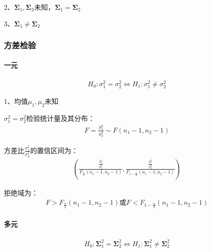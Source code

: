 \documentclass[12pt]{book}
\begin{document}
2、$\bm{\Sigma}_1,\bm{\Sigma}_2$未知，$\bm{\Sigma}_1=\bm{\Sigma}_2$

3、$\bm{\Sigma}_1\neq\bm{\Sigma}_2$

\subsubsection{方差检验}

\paragraph{一元}

\begin{gather*}
    H_0:\sigma_1^2=\sigma_2^2\Leftrightarrow H_1:\sigma_1^2\neq\sigma_2^2
\end{gather*}


1、均值$\mu_1,\mu_2$未知

$\sigma_1^2=\sigma_2^2$检验统计量及其分布：
\begin{gather*}
    F=\frac{S_1^2}{S_2^2}\sim F(n_1-1,n_2-1)
\end{gather*}


方差比$\frac{\sigma_1^2}{\sigma_2^2}$的置信区间为：
\begin{gather*}
    \left(
        \frac{\frac{S^2_1}{S_2^2}}{F_{\frac{\alpha}{2}}(n_1-1,n_2-1)},
        \frac{\frac{S^2_1}{S_2^2}}{F_{1-\frac{\alpha}{2}}(n_1-1,n_2-1)}
    \right)
\end{gather*}



拒绝域为：
\begin{gather*}
    F>F_{\frac{\alpha}{2}}(n_1-1,n_2-1)
    \text{或}
    F<F_{1-\frac{\alpha}{2}}(n_1-1,n_2-1)
\end{gather*}


\paragraph{多元}

\begin{gather*}
    H_0:\bm{\Sigma}_1^2=\bm{\Sigma}_2^2	\Leftrightarrow H_1:\bm{\Sigma}_1^2\neq\bm{\Sigma}_2^2
\end{gather*}
\end{document}

